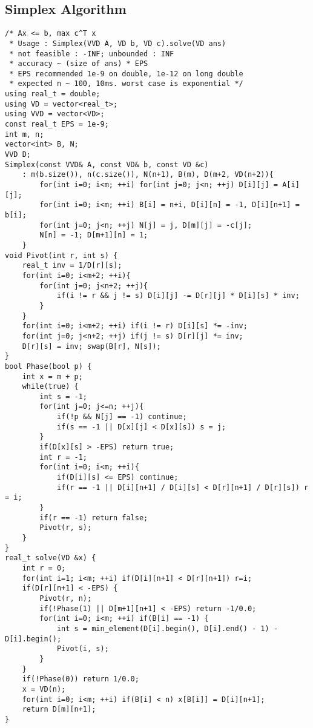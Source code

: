 \documentclass[landscape, 8pt, a4paper, oneside, twocolumn]{extarticle}
\begin{document}
\subsection{Simplex Algorithm}
\begin{verbatim}
/* Ax <= b, max c^T x
 * Usage : Simplex(VVD A, VD b, VD c).solve(VD ans)
 * not feasible : -INF; unbounded : INF
 * accuracy ~ (size of ans) * EPS
 * EPS recommended 1e-9 on double, 1e-12 on long double
 * expected n ~ 100, 10ms. worst case is exponential */
using real_t = double;
using VD = vector<real_t>;
using VVD = vector<VD>;
const real_t EPS = 1e-9;
int m, n;
vector<int> B, N;
VVD D;
Simplex(const VVD& A, const VD& b, const VD &c)
	: m(b.size()), n(c.size()), N(n+1), B(m), D(m+2, VD(n+2)){
		for(int i=0; i<m; ++i) for(int j=0; j<n; ++j) D[i][j] = A[i][j];
		for(int i=0; i<m; ++i) B[i] = n+i, D[i][n] = -1, D[i][n+1] = b[i];
		for(int j=0; j<n; ++j) N[j] = j, D[m][j] = -c[j];
		N[n] = -1; D[m+1][n] = 1;
	}
void Pivot(int r, int s) {
	real_t inv = 1/D[r][s];
	for(int i=0; i<m+2; ++i){
		for(int j=0; j<n+2; ++j){
			if(i != r && j != s) D[i][j] -= D[r][j] * D[i][s] * inv;
		}
	}
	for(int i=0; i<m+2; ++i) if(i != r) D[i][s] *= -inv;
	for(int j=0; j<n+2; ++j) if(j != s) D[r][j] *= inv;
	D[r][s] = inv; swap(B[r], N[s]);
}
bool Phase(bool p) {
	int x = m + p;
	while(true) {
		int s = -1;
		for(int j=0; j<=n; ++j){
			if(!p && N[j] == -1) continue;
			if(s == -1 || D[x][j] < D[x][s]) s = j;
		}
		if(D[x][s] > -EPS) return true;
		int r = -1;
		for(int i=0; i<m; ++i){
			if(D[i][s] <= EPS) continue;
			if(r == -1 || D[i][n+1] / D[i][s] < D[r][n+1] / D[r][s]) r = i;
		}
		if(r == -1) return false;
		Pivot(r, s);
	}
}
real_t solve(VD &x) {
	int r = 0;
	for(int i=1; i<m; ++i) if(D[i][n+1] < D[r][n+1]) r=i;
	if(D[r][n+1] < -EPS) {
		Pivot(r, n);
		if(!Phase(1) || D[m+1][n+1] < -EPS) return -1/0.0;
		for(int i=0; i<m; ++i) if(B[i] == -1) {
			int s = min_element(D[i].begin(), D[i].end() - 1) - D[i].begin();
			Pivot(i, s);
		}
	}
	if(!Phase(0)) return 1/0.0;
	x = VD(n);
	for(int i=0; i<m; ++i) if(B[i] < n) x[B[i]] = D[i][n+1];
	return D[m][n+1];
}
\end{verbatim}
\end{document}
